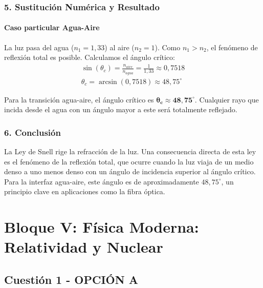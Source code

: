 \subsubsection*{5. Sustitución Numérica y Resultado}
\paragraph{Caso particular Agua-Aire}
La luz pasa del agua ($n_1 = 1,33$) al aire ($n_2 = 1$). Como $n_1 > n_2$, el fenómeno de reflexión total es posible. Calculamos el ángulo crítico:
\begin{gather}
    \sin(\theta_c) = \frac{n_{aire}}{n_{agua}} = \frac{1}{1,33} \approx 0,7518 \\
    \theta_c = \arcsin(0,7518) \approx 48,75^\circ
\end{gather}
\begin{cajaresultado}
    Para la transición agua-aire, el ángulo crítico es $\boldsymbol{\theta_c \approx 48,75^\circ}$. Cualquier rayo que incida desde el agua con un ángulo mayor a este será totalmente reflejado.
\end{cajaresultado}

\subsubsection*{6. Conclusión}
\begin{cajaconclusion}
La Ley de Snell rige la refracción de la luz. Una consecuencia directa de esta ley es el fenómeno de la reflexión total, que ocurre cuando la luz viaja de un medio denso a uno menos denso con un ángulo de incidencia superior al ángulo crítico. Para la interfaz agua-aire, este ángulo es de aproximadamente $48,75^\circ$, un principio clave en aplicaciones como la fibra óptica.
\end{cajaconclusion}

\newpage

\section{Bloque V: Física Moderna: Relatividad y Nuclear}
\label{sec:moderna_relatividad_2001_sep_ext}

\subsection{Cuestión 1 - OPCIÓN A}
\label{subsec:5A_2001_sep_ext}

